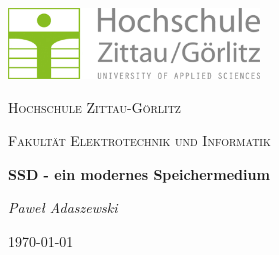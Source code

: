 \documentclass[a4paper,12pt]{article}
\begin{document}
\begin{titlepage}
	\centering
	\includegraphics[width=0.5\textwidth]{Bilder/hszglogo.png}\par\vspace{1cm}
	{\scshape\LARGE Hochschule Zittau-Görlitz \par}
	{\scshape\Large Fakultät Elektrotechnik und Informatik\par}
	\vspace{1.5cm}
	{\huge\bfseries SSD - ein modernes Speichermedium\par}
	\vspace{2cm}
	{\Large\itshape Paweł Adaszewski\par}


	\vfill

	{\large \today\par}
\end{titlepage}
\end{document}
